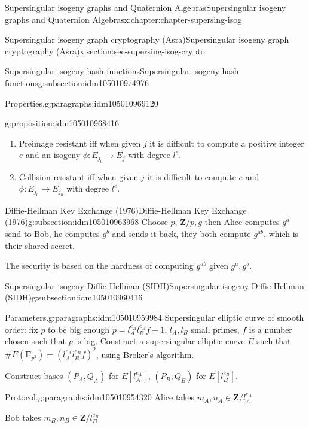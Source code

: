 \documentclass[oneside,10pt,]{book}
\numberwithin{equation}{section}
\newcommand{\lb}{[}
\newcommand{\rb}{]}
\newcommand{\ZZ}{\mathbf{Z}}
\newcommand{\FF}{\mathbf{F}}
\begin{document}
\begin{chapterptx}{Supersingular isogeny graphs and Quaternion Algebras}{}{Supersingular isogeny graphs and Quaternion Algebras}{}{}{x:chapter:chapter-supersing-isog}
\begin{sectionptx}{Supersingular isogeny graph cryptography (Asra)}{}{Supersingular isogeny graph cryptography (Asra)}{}{}{x:section:sec-supersing-isog-crypto}
\begin{subsectionptx}{Supersingular isogeny hash functions}{}{Supersingular isogeny hash functions}{}{}{g:subsection:idm105010974976}
\begin{paragraphs}{Properties.}{g:paragraphs:idm105010969120}
\begin{proposition}{}{}{g:proposition:idm105010968416}
\begin{enumerate}
\item{}Preimage resistant iff when given \(j\) it is difficult to compute a positive integer \(e\) and an isogeny \(\phi\colon E_{j_0} \to E_j\) with degree \(l^e\).%
\item{}Collision resistant iff when given \(j\) it is difficult to compute \(e\) and  \(\phi \colon E_{j_0} \to E_{j_0}\) with degree \(l^e\).%
\end{enumerate}
%
\end{proposition}
\end{paragraphs}%
\end{subsectionptx}
%
%
\typeout{************************************************}
\typeout{************************************************}
%
\begin{subsectionptx}{Diffie-Hellman Key Exchange (1976)}{}{Diffie-Hellman Key Exchange (1976)}{}{}{g:subsection:idm105010963968}
Choose \(p,\, \ZZ/p, g\) then Alice computes \(g^a\) send to Bob, he computes \(g^b\) and sends it back, they both compute \(g^{ab}\), which is their shared secret.%
\par
The security is based on the hardness of computing \(g^{ab}\) given \(g^a,g^b\).%
\end{subsectionptx}
%
%
\typeout{************************************************}
\typeout{************************************************}
%
\begin{subsectionptx}{Supersingular isogeny Diffie-Hellman (SIDH)}{}{Supersingular isogeny Diffie-Hellman (SIDH)}{}{}{g:subsection:idm105010960416}
\begin{paragraphs}{Parameters.}{g:paragraphs:idm105010959984}%
Supersingular elliptic curve of smooth order: fix \(p\) to be big enough \(p = l_A^{e_A} l_B^{e_B} f  \pm 1\). \(l_A,l_B\) small primes, \(f\) is a number chosen such that \(p\) is big. Construct a supersingular elliptic curve \(E\) such that \(\# E(\FF_{p^2}) = (l_A^{e_A}l_B^{e_B} f)^2\), using Broker's algorithm.%
\par
Construct bases \((P_A, Q_A)\) for \(E\lb l_A^{e_A}\rb\), \((P_B, Q_B)\) for \(E\lb l_B^{e_B}\rb\).%
\end{paragraphs}%
\begin{paragraphs}{Protocol.}{g:paragraphs:idm105010954320}%
Alice takes \(m_A,n_A \in \ZZ/l_A^{e_A}\)%
\par
Bob takes \(m_B,n_B \in \ZZ/l_B^{e_B}\)%
\par

\end{paragraphs}
\end{subsectionptx}
\end{sectionptx}
\end{chapterptx}
\end{document}
